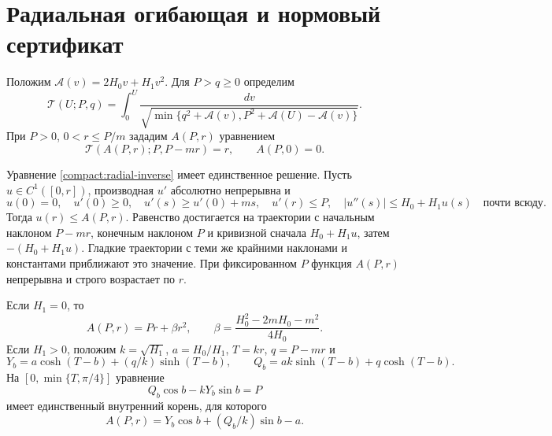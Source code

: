 \section{Радиальная огибающая и нормовый сертификат}
\label{bndnorm:section}\label{energy:section}
Положим $\mathcal A(v)=2H_0v+H_1v^2$. Для $P>q\ge0$ определим
\begin{equation}\label{boundarygap:time}
 \mathcal T(U;P,q)=\int_0^U
 \frac{dv}{\sqrt{\min\{q^2+\mathcal A(v),
                    P^2+\mathcal A(U)-\mathcal A(v)\}}}.
\end{equation}
При $P>0$, $0<r\le P/m$ зададим $A(P,r)$ уравнением
\begin{equation}\label{compact:radial-inverse}
 \mathcal T(A(P,r);P,P-mr)=r,\qquad A(P,0)=0.
\end{equation}

\begin{lemma}\label{compact:radial}
Уравнение \eqref{compact:radial-inverse} имеет единственное решение.
Пусть $u\in C^1([0,r])$, производная $u'$ абсолютно непрерывна и
\[
 u(0)=0,\quad u'(0)\ge0,\quad
 u'(s)\ge u'(0)+ms,\quad u'(r)\le P,\quad
 |u''(s)|\le H_0+H_1u(s)\quad\text{почти всюду}.
\]
Тогда $u(r)\le A(P,r)$. Равенство достигается на траектории с
начальным наклоном $P-mr$, конечным наклоном $P$ и кривизной
сначала $H_0+H_1u$, затем $-(H_0+H_1u)$.
Гладкие траектории с теми же крайними наклонами и константами
приближают это значение. При фиксированном $P$ функция $A(P,r)$
непрерывна и строго возрастает по $r$.

Если $H_1=0$, то
\begin{equation}\label{compact:radial-constant}
 A(P,r)=Pr+\beta r^2,\qquad
 \beta=\frac{H_0^2-2mH_0-m^2}{4H_0}.
\end{equation}
Если $H_1>0$, положим $k=\sqrt{H_1}$, $a=H_0/H_1$,
$T=kr$, $q=P-mr$ и
\[
 Y_b=a\cosh(T-b)+(q/k)\sinh(T-b),\qquad
 Q_b=ak\sinh(T-b)+q\cosh(T-b).
\]
На $[0,\min\{T,\pi/4\}]$ уравнение
\begin{equation}\label{compact:radial-switch}
 Q_b\cos b-kY_b\sin b=P
\end{equation}
имеет единственный внутренний корень, для которого
\begin{equation}\label{compact:radial-value}
 A(P,r)=Y_b\cos b+(Q_b/k)\sin b-a.
\end{equation}
\end{lemma}

